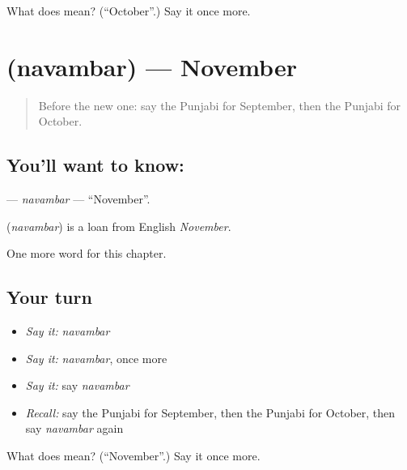 \begin{tcolorbox}[breakable,colback=teal!4,colframe=teal!35!black,title={Before you move on}]
What does  mean? (\textquotedblleft{}October\textquotedblright{}.) Say it once more.
\end{tcolorbox}
\section[\texorpdfstring{\pa{ਨਵੰਬਰ} (navambar)}{ਨਵੰਬਰ (navambar)}]{ (navambar) — November}

\label{lesson:PA-C103-navambar}



\begin{quote}
Before the new one: say the Punjabi for September, then the Punjabi for October.
\end{quote}

\subsection*{You'll want to know: }
\textbf{} — \emph{navambar} — \textquotedblleft{}November\textquotedblright{}.

\begin{cousinweb}
\textbf{} (\emph{navambar}) is a loan from English \emph{November}.
\end{cousinweb}

\begin{grammarlens}[title={What you've built}]
One more word for this chapter.
\end{grammarlens}

\subsection*{Your turn}
\begin{itemize}
\raggedright
  \item \emph{Say it:} \emph{navambar}
  \item \emph{Say it:} \emph{navambar}, once more
  \item \emph{Say it:} say \emph{navambar}
  \item \emph{Recall:} say the Punjabi for September, then the Punjabi for October, then say \emph{navambar} again
\end{itemize}

\begin{tcolorbox}[breakable,colback=teal!4,colframe=teal!35!black,title={Before you move on}]
What does  mean? (\textquotedblleft{}November\textquotedblright{}.) Say it once more.
\end{tcolorbox}
